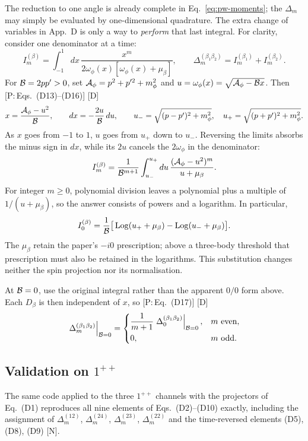 \documentclass[11pt,a4paper]{article}
\newcommand{\tagP}[1]{\textcolor{blue!65!black}{\textsf{\small[P:\,#1]}}}
\newcommand{\tagD}{\textcolor{orange!85!black}{\textsf{\small[D]}}}
\newcommand{\tagN}{\textcolor{red!70!black}{\textsf{\small[N]}}}
\newcommand{\D}[2]{\Delta^{(#1)}_{#2}}
\begin{document}
The reduction to one angle is already complete in Eq.~\eqref{eq:pw-moments}; the $\Delta_m$ may simply be evaluated by one-dimensional quadrature. The extra change of variables in App.~D is only a way to \emph{perform} that last integral. For clarity, consider one denominator at a time:
\[
I_m^{(\beta)}=\int_{-1}^{1}dx\,
\frac{x^m}{2\omega_\phi(x)[\omega_\phi(x)+\mu_\beta]},
\qquad
\D{\beta_1\beta_2}{m}=I_m^{(\beta_1)}+I_m^{(\beta_2)}.
\]
For ${\cal B}=2pp'>0$, set ${\cal A}_\phi=p^2+p^{\prime2}+m_\phi^2$ and
$u=\omega_\phi(x)=\sqrt{{\cal A}_\phi-{\cal B}x}$. Then \tagP{Eqs.~(D13)--(D16)} \tagD
\[
x=\frac{{\cal A}_\phi-u^2}{\cal B},\qquad
dx=-\frac{2u}{\cal B}\,du,\qquad
u_-=\sqrt{(p-p')^2+m_\phi^2},\quad
u_+=\sqrt{(p+p')^2+m_\phi^2}.
\]
As $x$ goes from $-1$ to $1$, $u$ goes from $u_+$ down to $u_-$. Reversing the limits absorbs the minus sign in $dx$, while its $2u$ cancels the $2\omega_\phi$ in the denominator:
\begin{equation}
I_m^{(\beta)}
=\frac1{{\cal B}^{m+1}}\int_{u_-}^{u_+}du\,
\frac{({\cal A}_\phi-u^2)^m}{u+\mu_\beta}.
\label{eq:pw-energy-integral}
\end{equation}
For integer $m\ge0$, polynomial division leaves a polynomial plus a multiple of $1/(u+\mu_\beta)$, so the answer consists of powers and a logarithm. In particular,
\[
I_0^{(\beta)}
=\frac1{\cal B}\big[\operatorname{Log}(u_++\mu_\beta)
-\operatorname{Log}(u_-+\mu_\beta)\big].
\]
The $\mu_\beta$ retain the paper's $-i0$ prescription; above a three-body threshold that prescription must also be retained in the logarithms. This substitution changes neither the spin projection nor its normalisation.

At ${\cal B}=0$, use the original integral rather than the apparent $0/0$ form above. Each $D_\beta$ is then independent of $x$, so \tagP{Eq.~(D17)} \tagD
\[
\left.\D{\beta_1\beta_2}{m}\right|_{{\cal B}=0}
=\begin{cases}
\displaystyle\frac1{m+1}
\left.\D{\beta_1\beta_2}{0}\right|_{{\cal B}=0},
&m\text{ even},\\[2mm]
0,&m\text{ odd}.
\end{cases}
\]

\subsection{Validation on $1^{++}$}

The same code applied to the three $1^{++}$ channels with the projectors of Eq.~(D1) reproduces all nine elements of Eqs.~(D2)--(D10) exactly, including the assignment of $\D{12}{m}$, $\D{24}{m}$, $\D{23}{m}$, $\D{22}{m}$ and the time-reversed elements (D5), (D8), (D9) \tagN.
\end{document}
